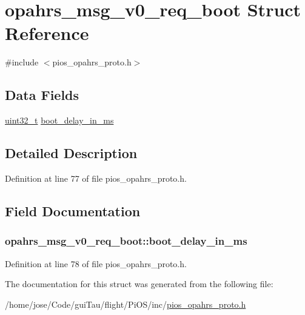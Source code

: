 \hypertarget{structopahrs__msg__v0__req__boot}{\section{opahrs\-\_\-msg\-\_\-v0\-\_\-req\-\_\-boot Struct Reference}
\label{structopahrs__msg__v0__req__boot}
}


{\ttfamily \#include $<$pios\-\_\-opahrs\-\_\-proto.\-h$>$}

\subsection*{Data Fields}
\begin{DoxyCompactItemize}
\item 
\hyperlink{stdint_8h_a435d1572bf3f880d55459d9805097f62}{uint32\-\_\-t} \hyperlink{structopahrs__msg__v0__req__boot_a1bdab1f6d948644d602398e7aaf7763c}{boot\-\_\-delay\-\_\-in\-\_\-ms}
\end{DoxyCompactItemize}


\subsection{Detailed Description}


Definition at line 77 of file pios\-\_\-opahrs\-\_\-proto.\-h.



\subsection{Field Documentation}
\hypertarget{structopahrs__msg__v0__req__boot_a1bdab1f6d948644d602398e7aaf7763c}{
\subsubsection[{boot\-\_\-delay\-\_\-in\-\_\-ms}]{ opahrs\-\_\-msg\-\_\-v0\-\_\-req\-\_\-boot\-::boot\-\_\-delay\-\_\-in\-\_\-ms}}\label{structopahrs__msg__v0__req__boot_a1bdab1f6d948644d602398e7aaf7763c}


Definition at line 78 of file pios\-\_\-opahrs\-\_\-proto.\-h.



The documentation for this struct was generated from the following file\-:\begin{DoxyCompactItemize}
\item 
/home/jose/\-Code/gui\-Tau/flight/\-Pi\-O\-S/inc/\hyperlink{pios__opahrs__proto_8h}{pios\-\_\-opahrs\-\_\-proto.\-h}\end{DoxyCompactItemize}
